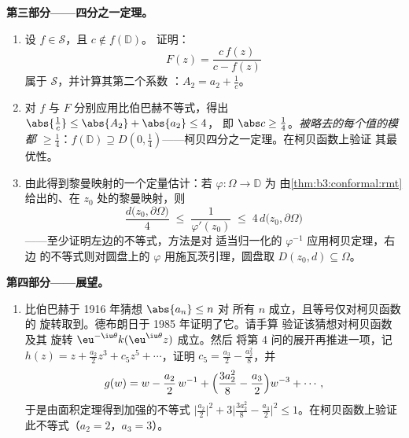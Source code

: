 \begin{problem}
\medskip
\noindent\textbf{第三部分——四分之一定理。}
\begin{enumerate}[resume]
  \item 设 $f \in \mathcal S$，且 $c \notin f(\mathbb D)$。
        证明：
        \[
        F(z) = \frac{c\,f(z)}{c - f(z)}
        \]
        属于 $\mathcal S$，并计算其第二个系数
        ：$A_2 = a_2 + \frac1c$。
  \item 对 $f$ 与 $F$ 分别应用比伯巴赫不等式，得出
        $\abs{\frac1c} \leq \abs{A_2} + \abs{a_2} \leq 4$，
        即 $\abs c \geq \frac14$。\emph{被略去的每个值的模都
        $\geq \frac14$}：$f(\mathbb D) \supseteq
        D(0, \frac14)$——柯贝四分之一定理。在柯贝函数上验证
        其最优性。
  \item 由此得到黎曼映射的一个定量估计：若
        $\varphi \colon \Omega \to \mathbb D$ 为
        由\cref{thm:b3:conformal:rmt}给出的、在 $z_0$ 处的黎曼映射，则
        \[
        \frac{d\bigl(z_0, \partial\Omega\bigr)}{4}
        \;\leq\; \frac1{\varphi'(z_0)} \;\leq\;
        4\,d\bigl(z_0, \partial\Omega\bigr)
        \]
——至少证明左边的不等式，方法是对
        适当归一化的 $\varphi^{-1}$ 应用柯贝定理，右边
        的不等式则对圆盘上的 $\varphi$ 用施瓦茨引理，圆盘取
        $D(z_0, d) \subseteq \Omega$。
\end{enumerate}

\medskip
\noindent\textbf{第四部分——展望。}
\begin{enumerate}[resume]
  \item 比伯巴赫于 1916 年猜想 $\abs{a_n} \leq n$ 对
        所有 $n$ 成立，且等号仅对柯贝函数的
        旋转取到。德布朗日于 1985 年证明了它。请手算
        验证该猜想对柯贝函数及其
        旋转 $\eu^{-\iu\theta}k(\eu^{\iu\theta}z)$ 成立。然后
        将第 4 问的展开再推进一项，记
        $h(z) = z + \frac{a_2}2z^3 + c_5z^5 + \cdots$，证明
        $c_5 = \frac{a_3}2 - \frac{a_2^2}8$，并
        \[
        g(w) = w - \frac{a_2}{2}\,w^{-1} +
        \Bigl(\frac{3a_2^2}8 - \frac{a_3}2\Bigr)w^{-3} +
        \cdots ,
        \]
        于是由面积定理得到加强的不等式
        $\bigl|\frac{a_2}2\bigr|^2 + 3\bigl|\frac{3a_2^2}8 -
        \frac{a_3}2\bigr|^2 \leq 1$。在柯贝函数上验证
        此不等式（$a_2 = 2$，$a_3 = 3$）。
\end{enumerate}


\end{problem}
